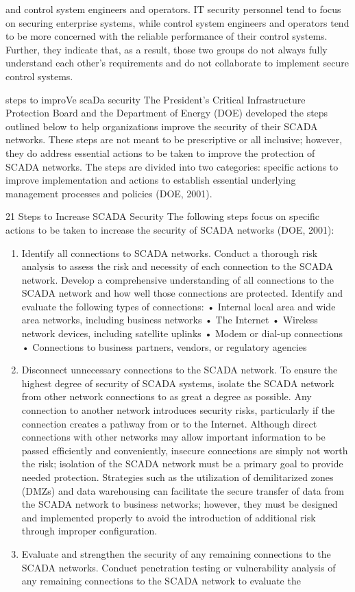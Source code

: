 \documentclass{article}
\begin{document}
and control system engineers and operators. IT security personnel tend
to focus on securing enterprise systems, while control system engineers
and operators tend to be more concerned with the reliable performance of
their control systems. Further, they indicate that, as a result, those
two groups do not always fully understand each other's requirements and
do not collaborate to implement secure control systems.

steps to improVe scaDa security The President's Critical Infrastructure
Protection Board and the Department of Energy (DOE) developed the steps
outlined below to help organizations improve the security of their SCADA
networks. These steps are not meant to be prescriptive or all inclusive;
however, they do address essential actions to be taken to improve the
protection of SCADA networks. The steps are divided into two categories:
specific actions to improve implementation and actions to establish
essential underlying management processes and policies (DOE, 2001).

21 Steps to Increase SCADA Security The following steps focus on
specific actions to be taken to increase the security of SCADA networks
(DOE, 2001):

\begin{enumerate}
\def\labelenumi{\arabic{enumi}.}
\tightlist
\item
  Identify all connections to SCADA networks. Conduct a thorough risk
  analysis to assess the risk and necessity of each connection to the
  SCADA network. Develop a comprehensive understanding of all
  connections to the SCADA network and how well those connections are
  protected. Identify and evaluate the following types of connections: •
  Internal local area and wide area networks, including business
  networks • The Internet • Wireless network devices, including
  satellite uplinks • Modem or dial-up connections • Connections to
  business partners, vendors, or regulatory agencies
\item
  Disconnect unnecessary connections to the SCADA network. To ensure the
  highest degree of security of SCADA systems, isolate the SCADA network
  from other network connections to as great a degree as possible. Any
  connection to another network introduces security risks, particularly
  if the connection creates a pathway from or to the Internet. Although
  direct connections with other networks may allow important information
  to be passed efficiently and conveniently, insecure connections are
  simply not worth the risk; isolation of the SCADA network must be a
  primary goal to provide needed protection. Strategies such as the
  utilization of demilitarized zones (DMZs) and data warehousing can
  facilitate the secure transfer of data from the SCADA network to
  business networks; however, they must be designed and implemented
  properly to avoid the introduction of additional risk through improper
  configuration.
\item
  Evaluate and strengthen the security of any remaining connections to
  the SCADA networks. Conduct penetration testing or vulnerability
  analysis of any remaining connections to the SCADA network to evaluate
  the
\end{enumerate}
\end{document}
